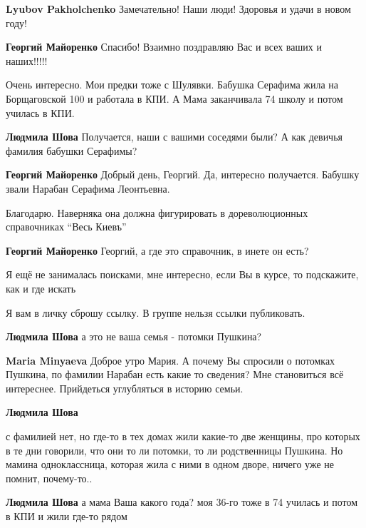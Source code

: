 \begin{itemize}
\begin{itemize} %
\textbf{Lyubov Pakholchenko} Замечательно! Наши люди! Здоровья и удачи в новом году!

\textbf{Георгий Майоренко} Спасибо! Взаимно поздравляю Вас и всех ваших и наших!!!!!
\end{itemize} %

Очень интересно.
Мои предки тоже с Шулявки.
Бабушка Серафима жила на Борщаговской 100 и работала в КПИ.
А Мама заканчивала 74 школу и потом училась в КПИ.

\begin{itemize} %
\textbf{Людмила Шова} Получается, наши с вашими соседями были? А как девичья фамилия бабушки Серафимы?

\begin{itemize} %
\textbf{Георгий Майоренко} Добрый день, Георгий.
Да, интересно получается.
Бабушку звали Нарабан Серафима Леонтьевна.

Благодарю. Наверняка она должна фигурировать в дореволюционных справочниках \enquote{Весь Киевъ}

\textbf{Георгий Майоренко}
Георгий, а где это справочник, в инете он есть?

Я ещё не занималась поисками, мне интересно, если Вы в курсе, то подскажите, как и где искать

Я вам в личку сброшу ссылку. В группе нельзя ссылки публиковать.

\textbf{Людмила Шова} а это не ваша семья - потомки Пушкина?

\textbf{Maria Minyaeva} Доброе утро Мария.
А почему Вы спросили о потомках Пушкина, по фамилии Нарабан есть какие то сведения?
Мне становиться всё интереснее.
Прийдеться углубляться в историю семьи.

\textbf{Людмила Шова} 

с фамилией нет, но где-то в тех домах жили какие-то две женщины, про которых в
те дни говорили, что они то ли потомки, то ли родственницы Пушкина. Но мамина
одноклассница, которая жила с ними в одном дворе, ничего уже не помнит,
почему-то..

\end{itemize} %

\textbf{Людмила Шова} а мама Ваша какого года? моя 36-го тоже в 74 училась и потом в КПИ и жили где-то рядом


\end{itemize}
\end{itemize}
